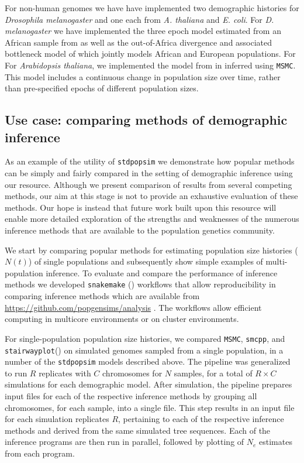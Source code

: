 \documentclass[12pt,halfline,a4paper]{ouparticle}
\newcommand{\stdpopsim}{\texttt{stdpopsim}\xspace}
\newcommand{\MSMC}{\texttt{MSMC}\xspace}
\newcommand{\smcpp}{\texttt{smcpp}\xspace}
\newcommand{\stairwayplot}{\texttt{stairwayplot}\xspace}
\begin{document}
For non-human genomes we have have implemented two demographic histories for
\emph{Drosophila melanogaster} and one each from \emph{A. thaliana} and \emph{E. coli}.
For \emph{D. melanogaster} we have implemented the three epoch model estimated from
an African sample from \cite{sheehan2016deep} as well as the out-of-Africa divergence
and associated bottleneck model of \cite{li2006inferring} which jointly models African
and European populations. For For \emph{Arabidopsis thaliana}, we implemented the
model from in \cite{durvasula2017african} inferred using \MSMC. This model includes
a continuous change in population size over time, rather than pre-specified epochs of different
population sizes.


\subsection*{Use case: comparing methods of demographic inference}
As an example of the utility of \stdpopsim we demonstrate how popular
methods can be simply and fairly compared in the setting of demographic
inference using our resource. Although we present comparison of results from several
competing methods, our aim at this stage is not to provide an exhaustive
evaluation of these methods. Our hope is instead that future work built upon this resource
will enable more detailed exploration of the strengths and weaknesses of the numerous
inference methods that are available to the population genetics community.

We start by comparing popular methods for estimating
population size histories ($N(t)$) of single populations and subsequently
show simple examples of multi-population inference.
To evaluate and compare the performance of inference methods we developed
\texttt{snakemake} (\cite{koster2012snakemake}) workflows that allow reproducibility
in comparing inference methods which are available from \url{https://github.com/popgensims/analysis}
. The workflows allow efficient computing in multicore environments or on
cluster environments.

For single-population population size histories, we compared \MSMC, \smcpp, and
\stairwayplot (\cite{schiffels2014inferring,terhorst2017robust,liu2015exploring})
 on simulated genomes sampled from a single population,
in a number of the \stdpopsim models described above. The pipeline was generalized to
run $R$ replicates with $C$ chromosomes for $N$ samples, for a total of $R \times C$
simulations for each demographic model. After simulation, the pipeline prepares
input files for each of the respective inference methods by grouping all
chromosomes, for each sample, into a single file. This step results in an
input file for each simulation replicates $R$, pertaining to each of the
respective inference methods and derived from the same simulated tree sequences.
Each of the inference programs are then run in parallel, followed by plotting of
$N_e$ estimates from each program.
\end{document}
